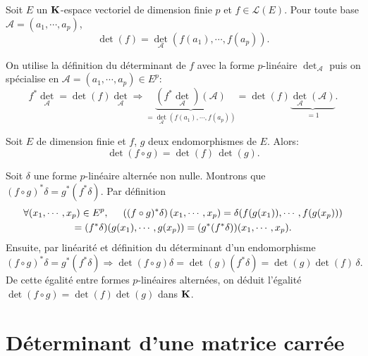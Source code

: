 \begin{propn}
 Soit $E$ un $\mathbf{K}$-espace vectoriel de dimension finie $p$ et $f \in \mathcal{L}(E)$. Pour toute base $\mathcal{A}=(a_1,\cdots,a_p)$,
\begin{displaymath}
 \det(f) = \det_{\mathcal{A}}(f(a_1),\cdots,f(a_p)).
\end{displaymath}
\end{propn}
\begin{demo}
On utilise la définition du déterminant de $f$ avec la forme $p$-linéaire $\det_\mathcal{A}$ puis on spécialise en $\mathcal{A}=(a_1,\cdots,a_p)\in E^p$:
\[
  f^*\det_\mathcal{A} = \det(f) \det_\mathcal{A} \Rightarrow 
  \underset{= \det_\mathcal{A}(f(a_1), \cdots, f(a_p))}{\underbrace{(f^*\det_\mathcal{A})(\mathcal{A})}} 
  = \det(f) \underset{ = 1}{\underbrace{\det_\mathcal{A}(\mathcal{A})}}.
\]
\end{demo}
\begin{propn}
 Soit $E$ de dimension finie et $f$, $g$ deux endomorphismes de $E$. Alors: 
\begin{displaymath}
 \det(f\circ g) = \det(f)\, \det(g).
\end{displaymath}
\end{propn}
\begin{demo}
 Soit $\delta$ une forme $p$-linéaire alternée non nulle. Montrons que $(f\circ g)^*\delta = g^*(f^*\delta)$. Par définition
\begin{multline*}
  \forall (x_1, \cdots, x_p) \in E^p, \hspace{0.5cm}
  \left((f\circ g)^*\delta\right)(x_1, \cdots, x_p)=\delta(f(g(x_1)), \cdots, f(g(x_p)))\\
  = (f^*\delta)(g(x_1), \cdots, g(x_p))
  = (g^*(f^*\delta))(x_1, \cdots ,x_p).
\end{multline*}
Ensuite, par linéarité et définition du déterminant d'un endomorphisme
\[
  (f\circ g)^*\delta = g^*(f^*\delta)
  \Rightarrow
  \det(f \circ g) \delta = \det(g) (f^*\delta) = \det(g) \det(f) \, \delta .
\]
De cette égalité entre formes $p$-linéaires alternées, on déduit l'égalité $\det(f\circ g) = \det(f) \det(g)$ dans $\mathbf{K}$.
\end{demo}

\section{Déterminant d'une matrice carrée}

